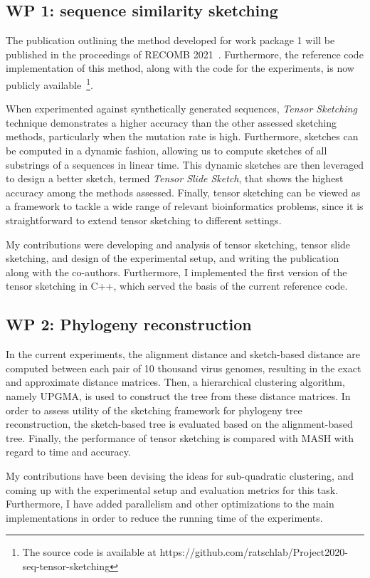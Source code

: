 

\subsection{WP 1: sequence similarity sketching}
The publication outlining the method developed for work package 1 will be published in the proceedings of RECOMB 2021~\cite{joudaki2020fast}. Furthermore, the reference code implementation of this method, along with the code for the experiments, is now publicly available~\footnote{The source code is available at https://github.com/ratschlab/Project2020-seq-tensor-sketching}. 

When experimented against synthetically generated sequences, \emph{Tensor Sketching} technique demonstrates a higher accuracy than the other assessed sketching methods, particularly when the mutation rate is high. Furthermore, sketches can be computed in a dynamic fashion, allowing us to compute sketches of all substrings of a sequences in linear time. This dynamic sketches are then leveraged to design a better sketch, termed \emph{Tensor Slide Sketch}, that shows the highest accuracy among the methods assessed. Finally, tensor sketching can be viewed as a framework to tackle a wide range of relevant bioinformatics problems, since it is straightforward to extend tensor sketching to different settings.

My contributions were developing and analysis of tensor sketching, tensor slide sketching, and design of the experimental setup, and writing the publication along with the co-authors. Furthermore, I implemented the first version of the tensor sketching in C++, which served the basis of the current reference code.


\subsection{WP 2: Phylogeny reconstruction}
In the current experiments, the alignment distance and sketch-based distance are computed between each pair of 10 thousand virus genomes, resulting in the exact and approximate distance matrices. Then, a hierarchical clustering algorithm, namely UPGMA, is used to construct the tree from these distance matrices. In order to assess utility of the sketching framework for phylogeny tree reconstruction, the sketch-based tree is evaluated based on the alignment-based tree. Finally, the performance of tensor sketching is compared with MASH with regard to time and accuracy. 

My contributions have been devising the ideas for sub-quadratic clustering, and coming up with the experimental setup and evaluation metrics for this task. Furthermore, I have added parallelism and other optimizations to the main implementations in order to reduce the running time of the experiments. 
